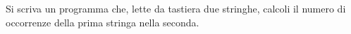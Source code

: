 \begin{Exercise}[label={ex:occorrenze}]
    Si scriva un programma che, lette da tastiera due stringhe, calcoli il numero di occorrenze della prima stringa nella seconda.
\end{Exercise}

\begin{Answer}[ref={ex:occorrenze}]
  	
\end{Answer}
